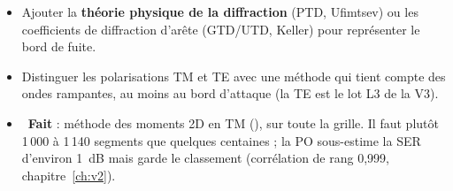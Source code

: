 \begin{pistes}
\begin{itemize}
\item Ajouter la \textbf{théorie physique de la diffraction} (PTD, Ufimtsev) ou les coefficients de diffraction d'arête (GTD/UTD, Keller) pour représenter le bord de fuite.
\item Distinguer les polarisations TM et TE avec une méthode qui tient compte des ondes rampantes, au moins au bord d'attaque (la TE est le lot L3 de la V3).
\item {}~\textbf{Fait} : méthode des moments 2D en TM (), sur toute la grille. Il faut plutôt 1\,000 à 1\,140 segments que quelques centaines ; la PO sous-estime la SER d'environ 1~dB mais garde le classement (corrélation de rang 0,999, chapitre~\ref{ch:v2}).
\end{itemize}
\end{pistes}

